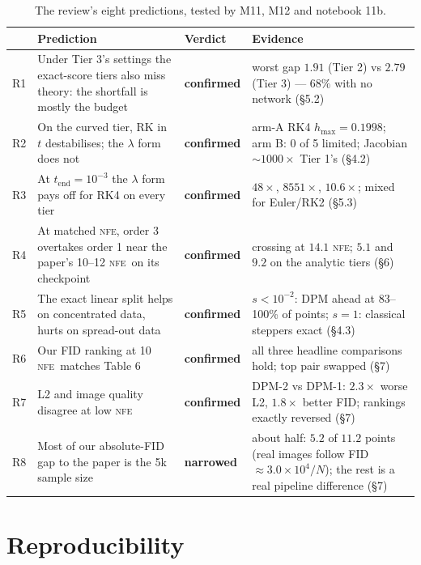 \documentclass[11pt,a4paper]{article}
\newcommand{\NFE}{\textsc{nfe}}
\newcommand{\lam}{\lambda}
\begin{document}
\begin{table}[!htbp]
\centering
\caption{The review's eight predictions, tested by M11, M12 and notebook 11b.}
\label{tab:ledger2}
\small
\begin{tabular}{@{}lp{6.0cm}lp{6.2cm}@{}}
\toprule
 & Prediction & Verdict & Evidence \\
\midrule
R1 & Under Tier 3's settings the exact-score tiers also miss theory: the shortfall is
mostly the budget & \textbf{confirmed} & worst gap $1.91$ (Tier 2) vs $2.79$
(Tier 3) --- $68\%$ with no network (\S5.2) \\[3pt]
R2 & On the curved tier, RK in $t$ destabilises; the $\lam$ form does not &
\textbf{confirmed} & arm-A RK4 $h_{\max} = 0.1998$; arm B: 0 of 5 limited;
Jacobian $\sim1000\times$ Tier 1's (\S4.2) \\[3pt]
R3 & At $t_{\text{end}}=10^{-3}$ the $\lam$ form pays off for RK4 on every tier &
\textbf{confirmed} & $48\times$, $8551\times$, $10.6\times$; mixed for Euler/RK2
(\S5.3) \\[3pt]
R4 & At matched \NFE, order 3 overtakes order 1 near the paper's 10--12 \NFE\ on its
checkpoint & \textbf{confirmed} & crossing at $14.1$ \NFE; $5.1$ and $9.2$ on the
analytic tiers (\S6) \\[3pt]
R5 & The exact linear split helps on concentrated data, hurts on spread-out data &
\textbf{confirmed} & $s<10^{-2}$: DPM ahead at 83--100\% of points; $s=1$:
classical steppers exact (\S4.3) \\[3pt]
R6 & Our FID ranking at 10 \NFE\ matches Table 6 & \textbf{confirmed} & all three
headline comparisons hold; top pair swapped (\S7) \\[3pt]
R7 & L2 and image quality disagree at low \NFE & \textbf{confirmed} & DPM-2
vs DPM-1: $2.3\times$ worse L2, $1.8\times$ better FID; rankings exactly reversed
(\S7) \\[3pt]
R8 & Most of our absolute-FID gap to the paper is the 5k sample size &
\textbf{narrowed} & about half: $5.2$ of $11.2$ points (real images follow FID
$\approx 3.0\times10^4/N$); the rest is a real pipeline difference (\S7) \\
\bottomrule
\end{tabular}
\end{table}

\clearpage   %
\section{Reproducibility}
\end{document}

